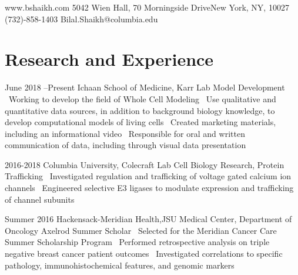 \documentclass{bscv}
\begin{document}
 {} {www.bshaikh.com} {5042 Wien Hall, 70 Morningside Drive\newline New York, NY, 10027} {(732)-858-1403} {Bilal.Shaikh@columbia.edu}


\section{Research and Experience}

\begin{eventlist}
 
\item{June 2018 --Present} 
  {Ichaan School of Medicine, Karr Lab}
  {Model Development}
  {\textbullet\ Working to develop the field of Whole Cell Modeling \newline \textbullet\ Use qualitative and quantitative data sources, in addition to background biology knowledge, to develop computational models of living cells \newline \textbullet\ Created marketing materials, including an informational video \newline \textbullet\ Responsible for oral and written communication of data, including through visual data presentation}
  

\item{2016-2018}
  {Columbia University, Colecraft Lab}
  {Cell Biology Research, Protein Trafficking}
  {\textbullet\  Investigated  regulation and trafficking of voltage gated calcium ion channels \newline \textbullet\  Engineered selective E3 ligases to modulate expression and trafficking of channel subunits}

\item{Summer 2016}
  {Hackensack-Meridian Health,\newline JSU Medical Center, Department of Oncology}
  {Axelrod Summer Scholar}
  {\textbullet\ Selected for the Meridian Cancer Care Summer Scholarship Program \newline \textbullet\ Performed retrospective analysis on triple negative breast cancer patient outcomes \newline \textbullet\ Investigated correlations to specific pathology, immunohistochemical features, and genomic markers}


\end{eventlist}
\end{document}
